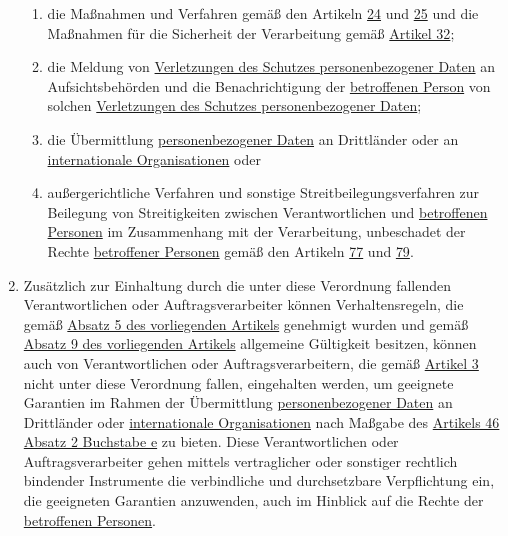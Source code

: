 \begin{enumerate}
\begin{enumerate}
    \item die Maßnahmen und Verfahren gemäß den Artikeln \hyperref[ch:24]{24} und \hyperref[ch:25]{25} und die Maßnahmen
     für die Sicherheit der Verarbeitung gemäß \hyperref[ch:32]{Artikel 32};
    \label{itm:40-2h}

    \item die Meldung von \hyperref[itm:04-12]{Verletzungen des Schutzes personenbezogener Daten} an Aufsichtsbehörden und die
     Benachrichtigung der \hyperref[itm:04-1]{betroffenen Person} von solchen \hyperref[itm:04-12]{Verletzungen des Schutzes personenbezogener Daten};
    \label{itm:40-2i}

    \item die Übermittlung \hyperref[itm:04-1]{personenbezogener Daten} an Drittländer oder an \hyperref[itm:04-29]{internationale Organisationen} oder
    \label{itm:40-2j}

    \item außergerichtliche Verfahren und sonstige Streitbeilegungsverfahren zur Beilegung von Streitigkeiten zwischen
     Verantwortlichen und \hyperref[itm:04-1]{betroffenen Personen} im Zusammenhang mit der Verarbeitung, unbeschadet der Rechte \hyperref[itm:04-1]{betroffener
     Personen} gemäß den Artikeln \hyperref[ch:77]{77} und \hyperref[ch:79]{79}.
    \label{itm:40-2k}

  \end{enumerate}

  \item Zusätzlich zur Einhaltung durch die unter diese Verordnung fallenden Verantwortlichen oder Auftragsverarbeiter
   können Verhaltensregeln, die gemäß \hyperref[itm:40-5]{Absatz 5 des vorliegenden Artikels} genehmigt wurden und
   gemäß \hyperref[itm:40-9]{Absatz 9 des vorliegenden Artikels} allgemeine Gültigkeit besitzen, können auch von
   Verantwortlichen oder Auftragsverarbeitern, die gemäß \hyperref[ch:3]{Artikel 3} nicht unter diese Verordnung
   fallen, eingehalten werden, um geeignete Garantien im Rahmen der Übermittlung \hyperref[itm:04-1]{personenbezogener Daten} an Drittländer
   oder \hyperref[itm:04-29]{internationale Organisationen} nach Maßgabe des \hyperref[itm:46-2e]{Artikels 46 Absatz 2 Buchstabe e} zu
   bieten. Diese Verantwortlichen oder Auftragsverarbeiter gehen mittels vertraglicher oder sonstiger rechtlich
   bindender Instrumente die verbindliche und durchsetzbare Verpflichtung ein, die geeigneten Garantien anzuwenden,
   auch im Hinblick auf die Rechte der \hyperref[itm:04-1]{betroffenen Personen}.
  \label{itm:40-3}


\end{enumerate}
